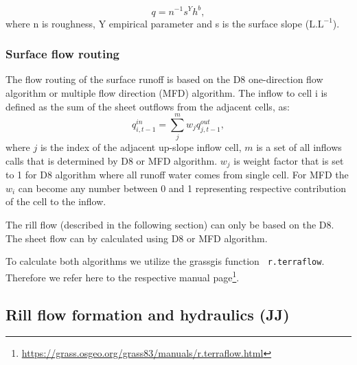         \begin{equation} 
        q = n^{-1} s^Y h^b,
        \label{eq:powerlaw2}
        \end{equation}
        where n is roughness,  Y  empirical parameter and s is the surface
        slope ($\mathrm{L.L^{-1}}$).

        \subsubsection{Surface flow routing}

            The flow routing of the surface runoff is based on the D8 one-direction flow
            algorithm \cite{o1984extraction} or multiple flow direction (MFD) algorithm.
            The inflow to cell i is defined as the sum of the sheet outflows
            from the adjacent cells, as:
            \begin{equation} 
            q^{in}_{i,t-1} = \sum_j^m w_j q^{out}_{j,t-1}, 
            \label{eq:routing}
            \end{equation} 
            where $j$ is the index of the adjacent up-slope inflow cell, $m$ is
            a set of all inflows calls that is determined by  D8 or MFD
            algorithm. $w_j$ is weight factor  that is set to 1 for D8
            algorithm where all runoff water comes from single cell. For MFD
            the $w_i$ can become any number between 0 and 1 representing
            respective contribution of the cell to the inflow. 

            The rill flow (described in the following section) can only be
            based on the D8. The sheet flow can by calculated using D8 or MFD
            algorithm.
            
            To calculate both algorithms we utilize the grassgis function {\tt
            r.terraflow}. Therefore we refer here to the respective manual
            page\footnote{\href{https://grass.osgeo.org/grass83/manuals/r.terraflow.html}{https://grass.osgeo.org/grass83/manuals/r.terraflow.html}}.

        \subsection{Rill flow formation and hydraulics (JJ)}

